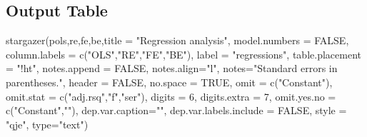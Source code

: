 \documentclass[
]{article}
\newenvironment{Shaded}{\begin{snugshade}}{\end{snugshade}}
\newcommand{\AttributeTok}[1]{\textcolor[rgb]{0.77,0.63,0.00}{#1}}
\newcommand{\ConstantTok}[1]{\textcolor[rgb]{0.00,0.00,0.00}{#1}}
\newcommand{\DecValTok}[1]{\textcolor[rgb]{0.00,0.00,0.81}{#1}}
\newcommand{\FunctionTok}[1]{\textcolor[rgb]{0.00,0.00,0.00}{#1}}
\newcommand{\NormalTok}[1]{#1}
\newcommand{\StringTok}[1]{\textcolor[rgb]{0.31,0.60,0.02}{#1}}
\begin{document}
\hypertarget{output-table}{%
\subsection{Output Table}\label{output-table}}

\begin{Shaded}
\begin{Highlighting}[]
  \FunctionTok{stargazer}\NormalTok{(pols,re,fe,be,}\AttributeTok{title =} \StringTok{"Regression analysis"}\NormalTok{, }
            \AttributeTok{model.numbers =} \ConstantTok{FALSE}\NormalTok{,}
            \AttributeTok{column.labels =} \FunctionTok{c}\NormalTok{(}\StringTok{"OLS"}\NormalTok{,}\StringTok{"RE"}\NormalTok{,}\StringTok{"FE"}\NormalTok{,}\StringTok{"BE"}\NormalTok{),}
            \AttributeTok{label =} \StringTok{"regressions"}\NormalTok{,}
            \AttributeTok{table.placement =} \StringTok{"!ht"}\NormalTok{,}
            \AttributeTok{notes.append =} \ConstantTok{FALSE}\NormalTok{,}
            \AttributeTok{notes.align=}\StringTok{"l"}\NormalTok{,}
            \AttributeTok{notes=}\StringTok{"Standard errors in parentheses."}\NormalTok{,}
            \AttributeTok{header =} \ConstantTok{FALSE}\NormalTok{,}
            \AttributeTok{no.space =} \ConstantTok{TRUE}\NormalTok{,}
            \AttributeTok{omit =} \FunctionTok{c}\NormalTok{(}\StringTok{"Constant"}\NormalTok{),}
            \AttributeTok{omit.stat =} \FunctionTok{c}\NormalTok{(}\StringTok{"adj.rsq"}\NormalTok{,}\StringTok{"f"}\NormalTok{,}\StringTok{"ser"}\NormalTok{),}
            \AttributeTok{digits =} \DecValTok{6}\NormalTok{,}
            \AttributeTok{digits.extra =} \DecValTok{7}\NormalTok{,}
            \AttributeTok{omit.yes.no =} \FunctionTok{c}\NormalTok{(}\StringTok{"Constant"}\NormalTok{,}\StringTok{""}\NormalTok{),}
            \AttributeTok{dep.var.caption=}\StringTok{""}\NormalTok{,}
            \AttributeTok{dep.var.labels.include =} \ConstantTok{FALSE}\NormalTok{,}
            \AttributeTok{style =} \StringTok{"qje"}\NormalTok{,}
            \AttributeTok{type=}\StringTok{"text"}\NormalTok{)}
\end{Highlighting}
\end{Shaded}
\end{document}
